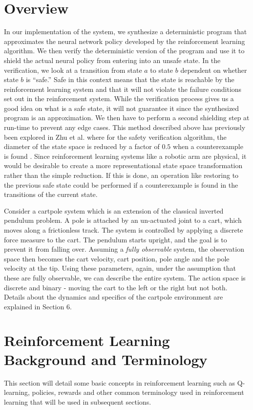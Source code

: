 \documentclass[acmsmall,review,authorversion]{acmart}
\begin{document}
\section{Overview}
In our implementation of the system, we synthesize a deterministic program that approximates the neural network policy developed by the reinforcement learning algorithm. We then verify the deterministic version of the program and use it to shield the actual neural policy from entering into an unsafe state. In the verification, we look at a transition from state $a$ to state $b$ dependent on whether state $b$ is ``safe.'' Safe in this context means that the state is reachable by the reinforcement learning system and that it will not violate the failure conditions set out in the reinforcement system. While the verification process gives us a good idea on what is a safe state, it will not guarantee it since the synthesized program is an approximation. We then have to perform a second shielding step at run-time to prevent any edge cases. This method described above has previously been explored in Zhu et al. where for the safety verification algorithm, the diameter of the state space is reduced by a factor of $0.5$ when a counterexample is found \cite{zhu:2019}. Since reinforcement learning systems like a robotic arm are physical, it would be desirable to create a more representational state space transformation rather than the simple reduction. If this is done, an operation like restoring to the previous safe state could be performed if a counterexample is found in the transitions of the current state.

Consider a cartpole system which is an extension of the classical inverted pendulum problem. A pole is attached by an un-actuated joint to a cart, which moves along a frictionless track. The system is controlled by applying a discrete force measure to the cart. The pendulum starts upright, and the goal is to prevent it from falling over. Assuming a \emph{fully observable} system, the observation space then becomes the cart velocity, cart position, pole angle and the pole velocity at the tip. Using these parameters, again, under the assumption that these are fully observable, we can describe the entire system. The action space is discrete and binary - moving the cart to the left or the right but not both. Details about the dynamics and specifics of the cartpole environment are explained in Section 6.

\section{Reinforcement Learning Background and Terminology}
This section will detail some basic concepts in reinforcement learning such as Q-learning, policies, rewards and other common terminology used in reinforcement learning that will be used in subsequent sections.
\end{document}
